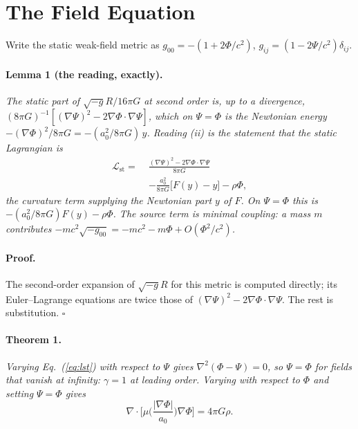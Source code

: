\documentclass[twocolumn]{iopjournal}
\begin{document}

\section*{The Field Equation}

Write the static weak-field metric as $g_{00} = -(1 + 2\Phi/c^2)$,
$g_{ij} = (1 - 2\Psi/c^2)\delta_{ij}$.

\paragraph{Lemma 1 (the reading, exactly).} \textit{The static part of
$\sqrt{-g}R/16\pi G$ at second order is, up to a divergence,
$(8\pi G)^{-1}[(\nabla\Psi)^2 - 2\nabla\Phi\cdot\nabla\Psi]$, which on
$\Psi = \Phi$ is the Newtonian energy $-(\nabla\Phi)^2/8\pi G =
-(a_0^2/8\pi G)\,y$. Reading (ii) is the statement that the static
Lagrangian is}
\begin{equation}
\begin{aligned}
\mathcal L_{\mathrm{st}} = \;&\frac{(\nabla\Psi)^2 - 2\nabla\Phi\cdot\nabla\Psi}{8\pi G}\\
&- \frac{a_0^2}{8\pi G}\big[F(y) - y\big] - \rho\Phi ,
\end{aligned}
\label{eq:lst}
\end{equation}
\textit{the curvature term supplying the Newtonian part $y$ of $F$. On
$\Psi = \Phi$ this is $-(a_0^2/8\pi G)F(y) - \rho\Phi$. The source term
is minimal coupling: a mass $m$ contributes
$-mc^2\sqrt{-g_{00}} = -mc^2 - m\Phi + O(\Phi^2/c^2)$.}

\paragraph{Proof.} The second-order expansion of $\sqrt{-g}R$ for this
metric is computed directly; its Euler--Lagrange equations are twice
those of $(\nabla\Psi)^2 - 2\nabla\Phi\cdot\nabla\Psi$. The rest is
substitution. \hfill $\square$

\paragraph{Theorem 1.} \textit{Varying Eq.~(\ref{eq:lst}) with respect
to $\Psi$ gives $\nabla^2(\Phi - \Psi) = 0$, so $\Psi = \Phi$ for
fields that vanish at infinity: $\gamma = 1$ at leading order. Varying
with respect to $\Phi$ and setting $\Psi = \Phi$ gives}
\begin{equation}
  \nabla\cdot\Big[\mu\Big(\frac{|\nabla\Phi|}{a_0}\Big)\nabla\Phi\Big]
  = 4\pi G\rho .
\label{eq:field}
\end{equation}
\end{document}
